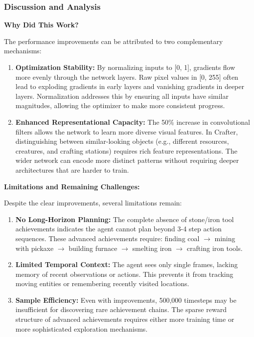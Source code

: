 \documentclass[twocolumn]{article}
\begin{document}
\subsubsection*{Discussion and Analysis}

\textbf{Why Did This Work?}

The performance improvements can be attributed to two complementary mechanisms:

\begin{enumerate}
    \item \textbf{Optimization Stability:} By normalizing inputs to [0, 1], gradients flow more evenly through the network layers. Raw pixel values in [0, 255] often lead to exploding gradients in early layers and vanishing gradients in deeper layers. Normalization addresses this by ensuring all inputs have similar magnitudes, allowing the optimizer to make more consistent progress.
    
    \item \textbf{Enhanced Representational Capacity:} The 50\% increase in convolutional filters allows the network to learn more diverse visual features. In Crafter, distinguishing between similar-looking objects (e.g., different resources, creatures, and crafting stations) requires rich feature representations. The wider network can encode more distinct patterns without requiring deeper architectures that are harder to train.
\end{enumerate}

\textbf{Limitations and Remaining Challenges:}

Despite the clear improvements, several limitations remain:

\begin{enumerate}
    \item \textbf{No Long-Horizon Planning:} The complete absence of stone/iron tool achievements indicates the agent cannot plan beyond 3-4 step action sequences. These advanced achievements require: finding coal $\rightarrow$ mining with pickaxe $\rightarrow$ building furnace $\rightarrow$ smelting iron $\rightarrow$ crafting iron tools.
    
    \item \textbf{Limited Temporal Context:} The agent sees only single frames, lacking memory of recent observations or actions. This prevents it from tracking moving entities or remembering recently visited locations.
    
    \item \textbf{Sample Efficiency:} Even with improvements, 500,000 timesteps may be insufficient for discovering rare achievement chains. The sparse reward structure of advanced achievements requires either more training time or more sophisticated exploration mechanisms.
\end{enumerate}
\end{document}
